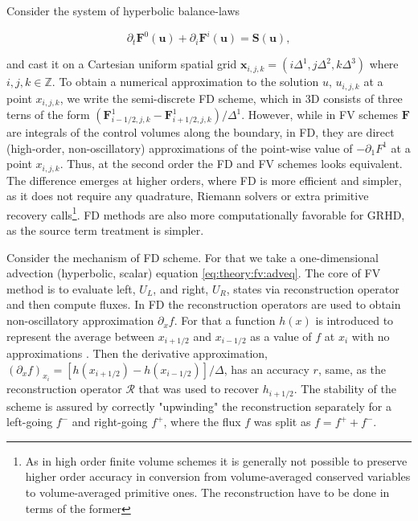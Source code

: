 \documentclass[11pt,a4paper,headinclude=true,DIV=14,BCOR=8mm,chapterprefix,listof=totoc,twoside,openright,abstracton]{scrbook}
\begin{document}
Consider the system of hyperbolic balance-laws

\begin{equation}
\partial_t\boldsymbol{F}^0(\boldsymbol{u}) + \partial_i\boldsymbol{F}^i(\boldsymbol{u}) = \boldsymbol{S}(\boldsymbol{u}),
\label{eq:theory:fd:hypsys}
\end{equation}

and cast it on a Cartesian uniform spatial grid $ \boldsymbol{x}_{i,j,k} = (i\Delta^1, j\Delta^2, k\Delta^3) $ where $ i,j,k\in \mathbb{Z} $. To obtain a numerical approximation to the solution $u$, $u_{i,j,k}$ at a point $x_{i,j,k}$, we write the semi-discrete FD scheme, which in 3D consists of three terns of the form $(\boldsymbol{F}^{1}_{i-1/2,j,k} - \boldsymbol{F}^{1}_{i+1/2,j,k}) / \Delta^1$. However, while in FV schemes $\boldsymbol{F}$ are integrals of the control volumes along the boundary, in FD, they are direct (high-order, non-oscillatory) approximations of the point-wise value of $-\partial_1 F^1$ at a point $x_{i,j,k}$. Thus, at the second order the FD and FV schemes looks equivalent. The difference emerges at higher orders, where FD is more efficient and simpler, as it  does not require any quadrature, Riemann solvers or extra primitive recovery calls\footnote{As in high order finite volume schemes it is generally not possible to preserve higher order accuracy in conversion from volume-averaged conserved variables to volume-averaged primitive ones. The reconstruction have to be done in terms of the former}. FD methods are also more computationally favorable for GRHD, as the source term treatment is simpler. 

Consider the mechanism of FD scheme. For that we take a one-dimensional advection (hyperbolic, scalar) equation \ref{eq:theory:fv:adveq}. The core of FV method is to evaluate left, $U_L$, and right, $U_R$, states via reconstruction operator and then compute fluxes. In FD the reconstruction operators are used to obtain non-oscillatory approximation $\partial_x f$. For that a function $h(x)$ is introduced to represent the average between $x_{i+1/2}$ and $x_{i-1/2}$ as a value of $f$ at $x_i$ with no approximations \cite{Shu:1988}. Then the derivative approximation, $(\partial_{x} f)_{x_i} = [h(x_{i+1/2}) - h(x_{i-1/2}) ]/\Delta$, has an accuracy $r$, same, as the reconstruction operator $\mathcal{R}$ that was used to recover $h_{i+1/2}$. The stability of the scheme is assured by correctly "upwinding" the reconstruction separately for a left-going $f^{-}$ and right-going $f^{+}$, where the flux $f$ was split as $f = f^{+} + f^{-}$.
\end{document}

